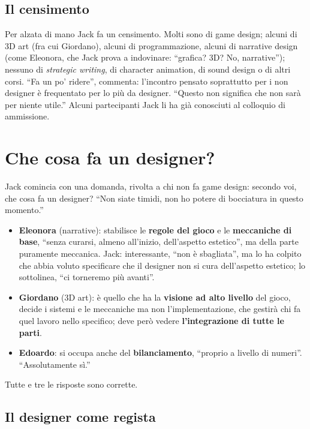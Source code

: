 \subsection{Il censimento}

Per alzata di mano Jack fa un censimento. Molti sono di game design; alcuni
di 3D art (fra cui Giordano), alcuni di programmazione, alcuni di narrative
design (come Eleonora, che Jack prova a indovinare: ``grafica? 3D? No,
narrative''); nessuno di \emph{strategic writing}, di character animation, di
sound design o di altri corsi. ``Fa un po' ridere'', commenta: l'incontro
pensato soprattutto per i non designer è frequentato per lo più da designer.
``Questo non significa che non sarà per niente utile.'' Alcuni partecipanti
Jack li ha già conosciuti al colloquio di ammissione.

\section{Che cosa fa un designer?}
\label{p2:sec:designer}

Jack comincia con una domanda, rivolta a chi non fa game design: secondo
voi, che cosa fa un designer? ``Non siate timidi, non ho potere di
bocciatura in questo momento.''
\begin{itemize}
  \item \textbf{Eleonora} (narrative): stabilisce le \textbf{regole del gioco}
        e le \textbf{meccaniche di base}, ``senza curarsi, almeno
        all'inizio, dell'aspetto estetico'', ma della parte puramente
        meccanica. Jack: interessante, ``non è sbagliata'', ma lo ha colpito
        che abbia voluto specificare che il designer non si cura
        dell'aspetto estetico; lo sottolinea, ``ci torneremo più avanti''.
  \item \textbf{Giordano} (3D art): è quello che ha la \textbf{visione ad
        alto livello} del gioco, decide i sistemi e le meccaniche ma non
        l'implementazione, che gestirà chi fa quel lavoro nello specifico;
        deve però vedere \textbf{l'integrazione di tutte le parti}.
  \item \textbf{Edoardo}: si occupa anche del \textbf{bilanciamento}, ``proprio
        a livello di numeri''. ``Assolutamente sì.''
\end{itemize}
Tutte e tre le risposte sono corrette.

\subsection{Il designer come regista}

